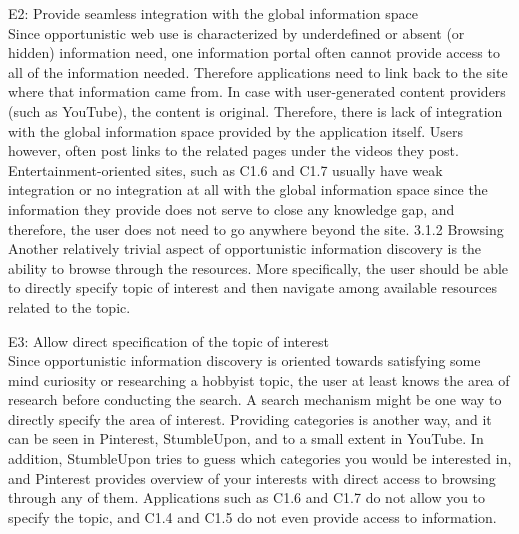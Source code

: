 \documentclass{casconpaper}
\begin{document}
{E2: Provide seamless integration with the global information space \\
Since opportunistic web use is characterized by underdefined  or absent (or hidden) information need, one information portal often cannot provide access to all of the information needed. Therefore applications need to link back to the site where that information came from. In case with user-generated content providers (such as YouTube), the content is original. Therefore, there is lack of integration with the global information space provided by the application itself. Users however, often post links to the related pages under the videos they post. Entertainment-oriented sites, such as C1.6 and C1.7 usually have weak integration or no integration at all with the global information space since the information they provide does not serve to close any knowledge gap, and therefore, the user does not need to go anywhere beyond the site. 
3.1.2 Browsing 
Another relatively trivial aspect of opportunistic information discovery is the ability to browse through the resources. More specifically, the user should be able to directly specify topic of interest and then navigate among available resources related to the topic.

E3: Allow direct specification of the topic of interest\\
Since opportunistic information discovery is oriented towards satisfying some mind curiosity or researching a hobbyist topic, the user at least knows the area of research before conducting the search. A search mechanism might be one way to directly specify the area of interest. Providing categories is another way, and it can be seen in Pinterest, StumbleUpon, and to a small extent in YouTube. In addition, StumbleUpon tries to guess which categories you would be interested in, and Pinterest provides overview of your interests with direct access to browsing through any of them.  Applications such as C1.6 and C1.7 do not allow you to specify the topic, and C1.4 and C1.5 do not even provide access to information. 

}
\end{document}
